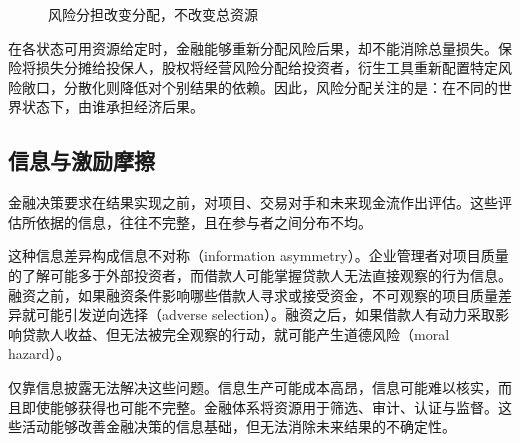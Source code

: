 \begin{figure}[H]

\caption{风险分担改变分配，不改变总资源}
\label{fig:ch1-risk-sharing}
\end{figure}

在各状态可用资源给定时，金融能够重新分配风险后果，却不能消除总量损失。保险将损失分摊给投保人，股权将经营风险分配给投资者，衍生工具重新配置特定风险敞口，分散化则降低对个别结果的依赖。因此，风险分配关注的是：在不同的世界状态下，由谁承担经济后果。

\subsection{信息与激励摩擦}

金融决策要求在结果实现之前，对项目、交易对手和未来现金流作出评估。这些评估所依据的信息，往往不完整，且在参与者之间分布不均。

这种信息差异构成信息不对称（information asymmetry）。企业管理者对项目质量的了解可能多于外部投资者，而借款人可能掌握贷款人无法直接观察的行为信息。融资之前，如果融资条件影响哪些借款人寻求或接受资金，不可观察的项目质量差异就可能引发逆向选择（adverse selection）。融资之后，如果借款人有动力采取影响贷款人收益、但无法被完全观察的行动，就可能产生道德风险（moral hazard）。

仅靠信息披露无法解决这些问题。信息生产可能成本高昂，信息可能难以核实，而且即使能够获得也可能不完整。金融体系将资源用于筛选、审计、认证与监督。这些活动能够改善金融决策的信息基础，但无法消除未来结果的不确定性。


